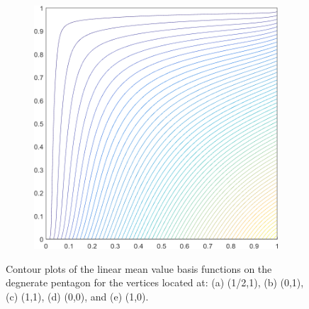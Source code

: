 \begin{figure}
\begin{subfigure}[b]{0.39\textwidth}
		\caption{}
	\end{subfigure}
	\hspace{1.5cm}
	\begin{subfigure}[b]{0.39\textwidth}
		\centering
		\includegraphics[width=\textwidth]{figures/sec_BF/deg_square_MV1_contour_b2.png}
		\caption{}
	\end{subfigure}
\caption{Contour plots of the linear mean value basis functions on the degnerate pentagon for the vertices located at: (a) (1/2,1), (b) (0,1), (c) (1,1), (d) (0,0), and (e) (1,0).}
\label{fig::2D_MV1_deg_square_basis_functions}
\end{figure}

